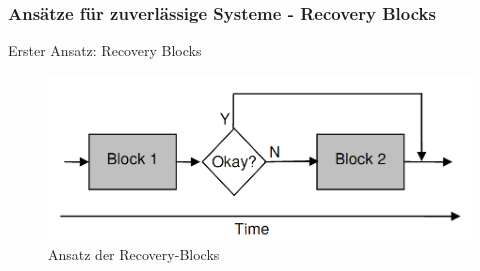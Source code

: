 \begin{frame}
	\frametitle{Ansätze für zuverlässige Systeme - Recovery Blocks}
	Erster Ansatz: Recovery Blocks \cite{Horning:1974:PSE:647641.733522}
	\begin{figure}
		\includegraphics[scale=0.3]{grafiken/recovery-block.png}		
		\caption{Ansatz der Recovery-Blocks
			\footnotemark		
		}		
	\end{figure}
\end{frame}
%
%
